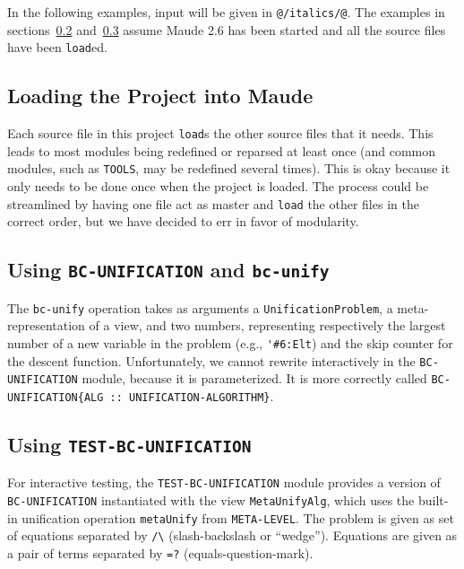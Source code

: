 \documentclass[11pt,twoside,titlepage]{article}
\newcommand{\TitleListing}[1]{\texorpdfstring{\lstinline|#1|}{#1}}
\begin{document}
In the following examples, input will be given in \lstinline|@/italics/@|. The
examples in sections~\ref{subappendix:using-bc-unif-mod}
and~\ref{subappendix:using-bc-test-mod} assume Maude 2.6 has been started and
all the source files have been \lstinline|load|ed.

\subsection{Loading the Project into Maude}\label{subappendix:loading}

Each source file in this project \lstinline|load|s the other source files that
it needs. This leads to most modules being redefined or reparsed at least once
(and common modules, such as \lstinline|TOOLS|, may be redefined several
times). This is okay because it only needs to be done once when the project is
loaded. The process could be streamlined by having one file act as master and
\lstinline|load| the other files in the correct order, but we have decided to
err in favor of modularity.
\vspace{1ex}



\subsection{Using \TitleListing{BC-UNIFICATION} and \TitleListing{bc-unify}}
\label{subappendix:using-bc-unif-mod}

The \lstinline|bc-unify| operation takes as arguments a
\lstinline|UnificationProblem|, a meta-representation of a view, and two
numbers, representing respectively the largest number of a new variable in the
problem (e.g., \lstinline|'#6:Elt|) and the skip counter for the descent
function. Unfortunately, we cannot rewrite interactively in the
\lstinline|BC-UNIFICATION| module, because it is parameterized. It is more
correctly called \lstinline|BC-UNIFICATION{ALG :: UNIFICATION-ALGORITHM}|.

\subsection{Using \TitleListing{TEST-BC-UNIFICATION}}
\label{subappendix:using-bc-test-mod}

For interactive testing, the \lstinline|TEST-BC-UNIFICATION| module provides a
version of \lstinline|BC-UNIFICATION| instantiated with the view
\lstinline|MetaUnifyAlg|, which uses the built-in unification operation
\lstinline|metaUnify| from \lstinline|META-LEVEL|. The problem is given as
set of equations separated by \lstinline|/\| (slash-backslash or ``wedge'').
Equations are given as a pair of terms separated by \lstinline|=?|
(equals-question-mark).
\end{document}

